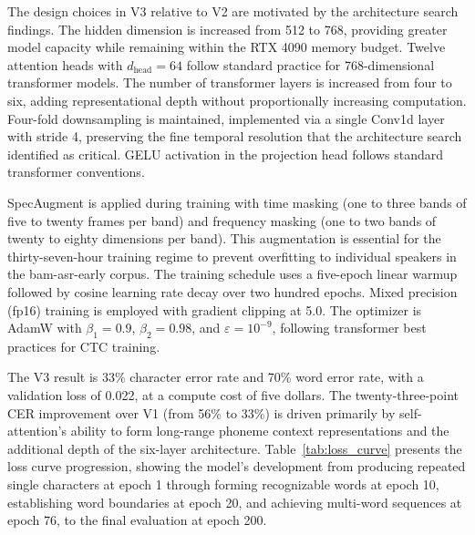 \documentclass[11pt]{article}
\begin{document}
The design choices in V3 relative to V2 are motivated by the architecture search findings. The hidden dimension is increased from 512 to 768, providing greater model capacity while remaining within the RTX 4090 memory budget. Twelve attention heads with $d_{\text{head}} = 64$ follow standard practice for 768-dimensional transformer models. The number of transformer layers is increased from four to six, adding representational depth without proportionally increasing computation. Four-fold downsampling is maintained, implemented via a single Conv1d layer with stride 4, preserving the fine temporal resolution that the architecture search identified as critical. GELU activation in the projection head follows standard transformer conventions.

SpecAugment \cite{park2019specaugment} is applied during training with time masking (one to three bands of five to twenty frames per band) and frequency masking (one to two bands of twenty to eighty dimensions per band). This augmentation is essential for the thirty-seven-hour training regime to prevent overfitting to individual speakers in the bam-asr-early corpus. The training schedule uses a five-epoch linear warmup followed by cosine learning rate decay over two hundred epochs. Mixed precision (fp16) training is employed with gradient clipping at 5.0. The optimizer is AdamW with $\beta_1 = 0.9$, $\beta_2 = 0.98$, and $\varepsilon = 10^{-9}$, following transformer best practices for CTC training.

The V3 result is 33\% character error rate and 70\% word error rate, with a validation loss of 0.022, at a compute cost of five dollars. The twenty-three-point CER improvement over V1 (from 56\% to 33\%) is driven primarily by self-attention's ability to form long-range phoneme context representations and the additional depth of the six-layer architecture. Table~\ref{tab:loss_curve} presents the loss curve progression, showing the model's development from producing repeated single characters at epoch 1 through forming recognizable words at epoch 10, establishing word boundaries at epoch 20, and achieving multi-word sequences at epoch 76, to the final evaluation at epoch 200.
\end{document}
